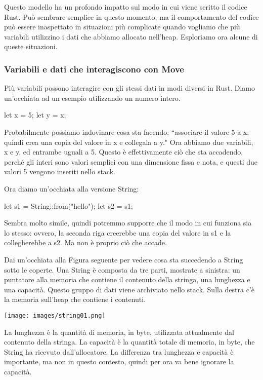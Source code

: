 \documentclass[11pt,a4paper]{article}
\begin{document}
{Questo modello ha un profondo impatto sul modo in cui viene scritto il codice Rust. Può sembrare semplice in questo momento, ma il comportamento del codice può essere inaspettato in situazioni più complicate quando vogliamo che più variabili utilizzino i dati che abbiamo allocato nell'heap. Esploriamo ora alcune di queste situazioni.

\subsubsection{Variabili e dati che interagiscono con Move}
Più variabili possono interagire con gli stessi dati in modi diversi in Rust. Diamo un'occhiata ad un esempio utilizzando un numero intero.
\begin{rust}
    let x = 5;
    let y = x;
\end{rust}
Probabilmente possiamo indovinare cosa sta facendo: “associare il valore 5 a x; quindi crea una copia del valore in x e collegala a y." Ora abbiamo due variabili, x e y, ed entrambe uguali a 5. Questo è effettivamente ciò che sta accadendo, perché gli interi sono valori semplici con una dimensione fissa e nota, e questi due valori 5 vengono inseriti nello stack.

Ora diamo un'occhiata alla versione String:
\begin{rust}
    let s1 = String::from("hello");
    let s2 = s1;
\end{rust}
Sembra molto simile, quindi potremmo supporre che il modo in cui funziona sia lo stesso: ovvero, la seconda riga creerebbe una copia del valore in s1 e la collegherebbe a s2. Ma non è proprio ciò che accade.

Dai un'occhiata alla Figura seguente per vedere cosa sta succedendo a String sotto le coperte. Una String è composta da tre parti, mostrate a sinistra: un puntatore alla memoria che contiene il contenuto della stringa, una lunghezza e una capacità. Questo gruppo di dati viene archiviato nello stack. Sulla destra c'è la memoria sull'heap che contiene i contenuti.
\begin{center}
\texttt{[image: images/string01.png]}
\end{center}

La lunghezza è la quantità di memoria, in byte, utilizzata attualmente dal contenuto della stringa. La capacità è la quantità totale di memoria, in byte, che String ha ricevuto dall'allocatore. La differenza tra lunghezza e capacità è importante, ma non in questo contesto, quindi per ora va bene ignorare la capacità.

}
\end{document}
